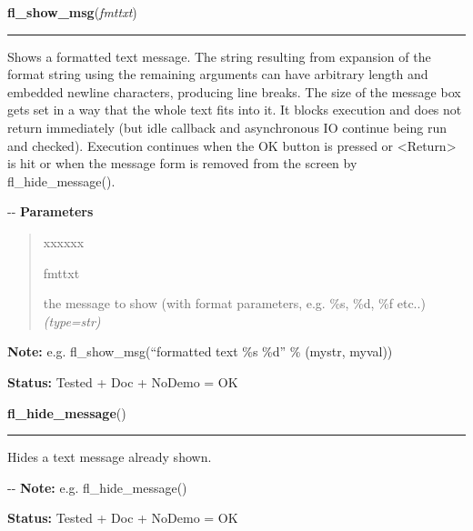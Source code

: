 \hspace{.8\funcindent}\begin{boxedminipage}{\funcwidth}

    \raggedright \textbf{fl\_show\_msg}(\textit{fmttxt})

    \vspace{-1.5ex}

    \rule{\textwidth}{0.5\fboxrule}
\setlength{\parskip}{2ex}

Shows a formatted text message. The string resulting from expansion
of the format string using the remaining arguments can have arbitrary
length and embedded newline characters, producing line breaks. The size
of the message box gets set in a way that the whole text fits into it.
It blocks execution and does not return immediately (but idle callback
and asynchronous IO continue being run and checked). Execution continues
when the OK button is pressed or <Return> is hit or when the message
form is removed from the screen by fl\_hide\_message().

-{}-
\setlength{\parskip}{1ex}
      \textbf{Parameters}
      \vspace{-1ex}

      \begin{quote}
        \begin{Ventry}{xxxxxx}

          \item[fmttxt]


the message to show (with format parameters, e.g. \%s, \%d, \%f etc..)
            {\it (type=str)}

        \end{Ventry}

      \end{quote}

\textbf{Note:} 
e.g. fl\_show\_msg(``formatted text \%s \%d'' \% (mystr, myval))


\textbf{Status:} 
Tested + Doc + NoDemo = OK


    \end{boxedminipage}

    \label{xformslib:flgoodies:fl_hide_message}

    \vspace{0.5ex}

\hspace{.8\funcindent}\begin{boxedminipage}{\funcwidth}

    \raggedright \textbf{fl\_hide\_message}()

    \vspace{-1.5ex}

    \rule{\textwidth}{0.5\fboxrule}
\setlength{\parskip}{2ex}

Hides a text message already shown.

-{}-
\setlength{\parskip}{1ex}
\textbf{Note:} 
e.g. fl\_hide\_message()


\textbf{Status:} 
Tested + Doc + NoDemo = OK


    \end{boxedminipage}

